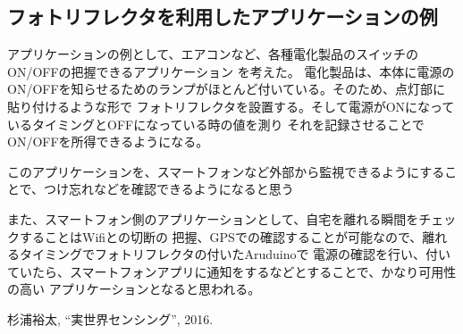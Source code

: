 \documentclass[11pt,a4j]{jsarticle}
\begin{document}
\subsection{フォトリフレクタを利用したアプリケーションの例}
\label{sub:フォトリフレクタを利用したアプリケーションの例}

アプリケーションの例として、エアコンなど、各種電化製品のスイッチのON/OFFの把握できるアプリケーション
を考えた。
電化製品は、本体に電源のON/OFFを知らせるためのランプがほとんど付いている。そのため、点灯部に貼り付けるような形で
フォトリフレクタを設置する。そして電源がONになっているタイミングとOFFになっている時の値を測り
それを記録させることでON/OFFを所得できるようになる。

このアプリケーションを、スマートフォンなど外部から監視できるようにすることで、つけ忘れなどを確認できるようになると思う

また、スマートフォン側のアプリケーションとして、自宅を離れる瞬間をチェックすることはWifiとの切断の
把握、GPSでの確認することが可能なので、離れるタイミングでフォトリフレクタの付いたAruduinoで
電源の確認を行い、付いていたら、スマートフォンアプリに通知をするなどとすることで、かなり可用性の高い
アプリケーションとなると思われる。


\begin{thebibliography}{9} %
 杉浦裕太, ``実世界センシング'', 2016.
\end{thebibliography}
\end{document}
